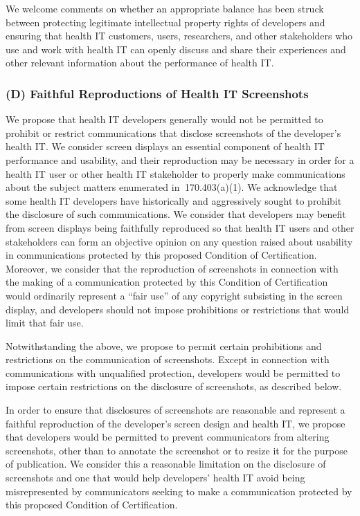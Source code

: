 \documentclass[twoside,11pt]{article}
\begin{document}
          





          We welcome comments on whether an appropriate balance has been struck between protecting legitimate intellectual property rights of developers and ensuring that health IT customers, users, researchers, and other stakeholders who use and work with health IT can openly discuss and share their experiences and other relevant  \ifhmode\expandafter\xspace\fi information about the performance of health IT.


          \subsubsection{(D) Faithful Reproductions of Health IT Screenshots}

          We propose that health IT developers generally would not be permitted to prohibit or restrict communications that disclose screenshots of the developer's health IT. We consider screen displays an essential component of health IT performance and usability, and their reproduction may be necessary in order for a health IT user or other health IT stakeholder to properly make communications about the subject matters enumerated in \textsection{} 170.403(a)(1). We acknowledge that some health IT developers have historically and aggressively sought to prohibit the disclosure of such communications. We consider that developers may benefit from screen displays being faithfully reproduced so that health IT users and other stakeholders can form an objective opinion on any question raised about usability in communications protected by this proposed Condition of Certification. Moreover, we consider that the reproduction of screenshots in connection with the making of a communication protected by this Condition of Certification would ordinarily represent a “fair use” of any copyright subsisting in the screen display, and developers should not impose prohibitions or restrictions that would limit that fair use.


          Notwithstanding the above, we propose to permit certain prohibitions and restrictions on the communication of screenshots. Except in connection with communications with unqualified protection, developers would be permitted to impose certain restrictions on the disclosure of screenshots, as described below.


          In order to ensure that disclosures of screenshots are reasonable and represent a faithful reproduction of the developer's screen design and health IT, we propose that developers would be permitted to prevent communicators from altering screenshots, other than to annotate the screenshot or to resize it for the purpose of publication. We consider this a reasonable limitation on the disclosure of screenshots and one that would help developers' health IT avoid being misrepresented by communicators seeking to make a communication protected by this proposed Condition of Certification.
\end{document}
